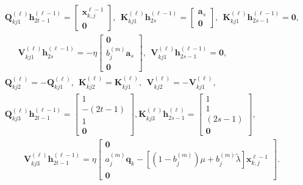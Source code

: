 \documentclass[10pt]{article}
\newcommand{\<}{\left\langle}
\renewcommand{\>}{\right\rangle}
\renewcommand{\bQ}{\mathbf{Q}}
\newcommand{\bzero}{{\mathbf 0}}
\newcommand{\prodeig}{{\mu}}
\newcommand{\intvec}{{\mathbf {q}}}
\def\bK{{\mathbf K}}
\def\bQ{{\mathbf Q}}
\def\bV{{\mathbf V}}
\def\ba{{\mathbf a}}
\def\bh{{\mathbf h}}
\def\bx{{\mathbf x}}
\begin{document}
\begin{align*}
    &\bQ_{kj1}^{(\ell)}\bh^{(\ell-1)}_{2t-1}=\begin{bmatrix}
        \bx_{k,j}^{\ell-1}\\\bzero
    \end{bmatrix},~~ \bK_{kj1}^{(\ell)}\bh^{(\ell-1)}_{2s}=\begin{bmatrix}
        \ba_{s}\\\bzero
\end{bmatrix},~~\bK_{kj1}^{(\ell)}\bh^{(\ell-1)}_{2s-1}=\bzero,\\
&~~~~ ~~~\bV_{kj1}^{(\ell)}\bh^{(\ell-1)}_{2s}=-\eta\begin{bmatrix}
        \bzero\\ b_j^{(m)}\ba_s \\ \bzero
    \end{bmatrix},~~\bV_{kj1}^{(\ell)}\bh^{(\ell-1)}_{2s-1}=\bzero,\\
    &
    \bQ_{kj2}^{(\ell)}=-\bQ_{kj1}^{(\ell)},~~ \bK_{kj2}^{(\ell)}=\bK_{kj1}^{(\ell)},~~  \bV_{kj2}^{(\ell)}=-\bV_{kj1}^{(\ell)},\\
    
    
    
    
    
    
    
    
    
    
    
     &
     \bQ_{kj3}^{(\ell)}\bh^{(\ell-1)}_{2t-1}=\begin{bmatrix}
         1\\-(2t-1)\\ 1\\\bzero
    \end{bmatrix}, 
    
    
    
\bK_{kj3}^{(\ell)}\bh^{(\ell)}_{2s-1}=\begin{bmatrix}
        1\\ 1 \\(2s-1)\\\bzero
    \end{bmatrix}, \\&\qquad~\bV_{kj3}^{(\ell)}\bh^{(\ell-1)}_{2t-1}=\eta\begin{bmatrix}
        \bzero\\ a_j^{(m)}\intvec_k-[(1-b_j^{(m)})\prodeig+b_j^{(m)}\tilde\lambda]\bx_{k,j}^{\ell-1}\\ \bzero
    \end{bmatrix}.
\end{align*}
\end{document}

